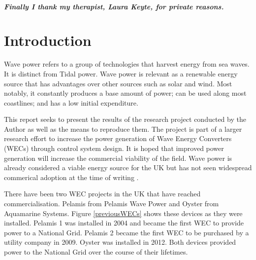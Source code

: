 \documentclass{report}
\begin{document}
\paragraph{Finally I thank my therapist, Laura Keyte, for private reasons.}
\tableofcontents
\listoffigures
\listoftables

\mbox{}


\printnomenclature

\chapter{Introduction}
Wave power refers to a group of technologies that harvest energy from sea waves. It is distinct from Tidal power. Wave power is relevant as a renewable energy source that has advantages over other sources such as solar and wind. Most notably, it constantly produces a base amount of power; can be used along most coastlines; and has a low initial expenditure. \cite{carbonTrust}

This report seeks to present the results of the research project conducted by the Author as well as the means to reproduce them. The project is part of a larger research effort to increase the power generation of Wave Energy Converters (WECs) through control system design. It is hoped that improved power generation will increase the commercial viability of the field. Wave power is already considered a viable energy source for the UK \cite{carbonTrust} but has not seen widespread commerical adoption at the time of writing \cite{europeanMarineEnergyCenter}.

There have been two WEC projects in the UK that have reached commercialisation. Pelamis from Pelamis Wave Power and Oyster from Aquamarine Systems\cite{europeanMarineEnergyCenter}. Figure \ref{previousWECs} shows these devices as they were installed. Pelamis 1 was installed in 2004 and became the first WEC to provide power to a National Grid. Pelamis 2 became the first WEC to be purchased by a utility company in 2009. Oyster was installed in 2012. Both devices provided power to the National Grid over the course of their lifetimes.
\end{document}
